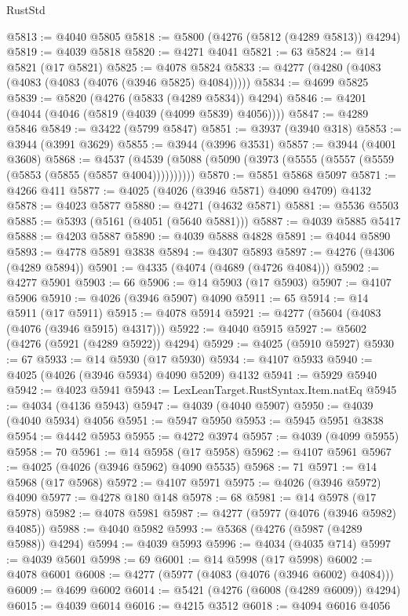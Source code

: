 \begin{lexlean}{RustStd}
\begin{coremodule}
@5813 := @4040 @5805
@5818 := @5800 (@4276 (@5812 (@4289 @5813)) @4294)
@5819 := @4039 @5818
@5820 := @4271 @4041
@5821 := 63
@5824 := @14 @5821 (@17 @5821)
@5825 := @4078 @5824
@5833 := @4277 (@4280 (@4083 (@4083 (@4083 (@4076 (@3946 @5825) @4084)))))
@5834 := @4699 @5825
@5839 := @5820 (@4276 (@5833 (@4289 @5834)) @4294)
@5846 := @4201 (@4044 (@4046 (@5819 (@4039 (@4099 @5839) @4056))))
@5847 := @4289 @5846
@5849 := @3422 (@5799 @5847)
@5851 := @3937 (@3940 @318)
@5853 := @3944 (@3991 @3629)
@5855 := @3944 (@3996 @3531)
@5857 := @3944 (@4001 @3608)
@5868 := @4537 (@4539 (@5088 (@5090 (@3973 (@5555 (@5557 (@5559 (@5853 (@5855 (@5857 @4004))))))))))
@5870 := @5851 @5868 @5097
@5871 := @4266 @411
@5877 := @4025 (@4026 (@3946 @5871) @4090 @4709) @4132
@5878 := @4023 @5877
@5880 := @4271 (@4632 @5871)
@5881 := @5536 @5503
@5885 := @5393 (@5161 (@4051 (@5640 @5881)))
@5887 := @4039 @5885 @5417
@5888 := @4203 @5887
@5890 := @4039 @5888 @4828
@5891 := @4044 @5890
@5893 := @4778 @5891 @3838
@5894 := @4307 @5893
@5897 := @4276 (@4306 (@4289 @5894))
@5901 := @4335 (@4074 (@4689 (@4726 @4084)))
@5902 := @4277 @5901
@5903 := 66
@5906 := @14 @5903 (@17 @5903)
@5907 := @4107 @5906
@5910 := @4026 (@3946 @5907) @4090
@5911 := 65
@5914 := @14 @5911 (@17 @5911)
@5915 := @4078 @5914
@5921 := @4277 (@5604 (@4083 (@4076 (@3946 @5915) @4317)))
@5922 := @4040 @5915
@5927 := @5602 (@4276 (@5921 (@4289 @5922)) @4294)
@5929 := @4025 (@5910 @5927)
@5930 := 67
@5933 := @14 @5930 (@17 @5930)
@5934 := @4107 @5933
@5940 := @4025 (@4026 (@3946 @5934) @4090 @5209) @4132
@5941 := @5929 @5940
@5942 := @4023 @5941
@5943 := LexLeanTarget.RustSyntax.Item.natEq
@5945 := @4034 (@4136 @5943)
@5947 := @4039 (@4040 @5907)
@5950 := @4039 (@4040 @5934) @4056
@5951 := @5947 @5950
@5953 := @5945 @5951 @3838
@5954 := @4442 @5953
@5955 := @4272 @3974
@5957 := @4039 (@4099 @5955)
@5958 := 70
@5961 := @14 @5958 (@17 @5958)
@5962 := @4107 @5961
@5967 := @4025 (@4026 (@3946 @5962) @4090 @5535)
@5968 := 71
@5971 := @14 @5968 (@17 @5968)
@5972 := @4107 @5971
@5975 := @4026 (@3946 @5972) @4090
@5977 := @4278 @180 @148
@5978 := 68
@5981 := @14 @5978 (@17 @5978)
@5982 := @4078 @5981
@5987 := @4277 (@5977 (@4076 (@3946 @5982) @4085))
@5988 := @4040 @5982
@5993 := @5368 (@4276 (@5987 (@4289 @5988)) @4294)
@5994 := @4039 @5993
@5996 := @4034 (@4035 @714)
@5997 := @4039 @5601
@5998 := 69
@6001 := @14 @5998 (@17 @5998)
@6002 := @4078 @6001
@6008 := @4277 (@5977 (@4083 (@4076 (@3946 @6002) @4084)))
@6009 := @4699 @6002
@6014 := @5421 (@4276 (@6008 (@4289 @6009)) @4294)
@6015 := @4039 @6014
@6016 := @4215 @3512
@6018 := @4094 @6016 @4056

\end{coremodule}
\end{lexlean}
